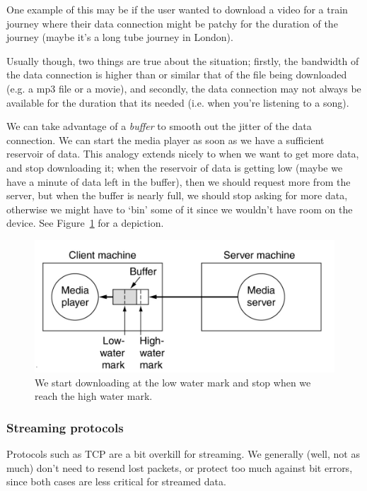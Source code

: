 One example of this may be if the user wanted to download a video for a train
journey where their data connection might be patchy for the duration of the
journey (maybe it's a long tube journey in London).


Usually though, two things are true about the situation; firstly, the bandwidth
of the data connection is higher than or similar that of the file being
downloaded (e.g. a mp3 file or a movie), and secondly, the data connection may
not always be available for the duration that its needed (i.e. when you're
listening to a song).

We can take advantage of a \textit{buffer} to smooth out the jitter of the data
connection. We can start the media player as soon as we have a sufficient
reservoir of data. This analogy extends nicely to when we want to get more data,
and stop downloading it; when the reservoir of data is getting low (maybe we have
a minute of data left in the buffer), then we should request more from the
server, but when the buffer is nearly full, we should stop asking for more data,
otherwise we might have to `bin' some of it since we wouldn't have room on the
device. See Figure~\ref{fig:buffers} for a depiction.

\begin{figure}[ht]
  \includegraphics[width=\textwidth]{images/buffer}
  \caption{We start downloading at the low water mark and stop when we reach the
  high water mark.}
  \label{fig:buffers}
\end{figure}

\subsubsection{Streaming protocols}

Protocols such as TCP are a bit overkill for streaming. We generally (well, not
as much) don't need to resend lost packets, or protect too much against bit
errors, since both cases are less critical for streamed data.

